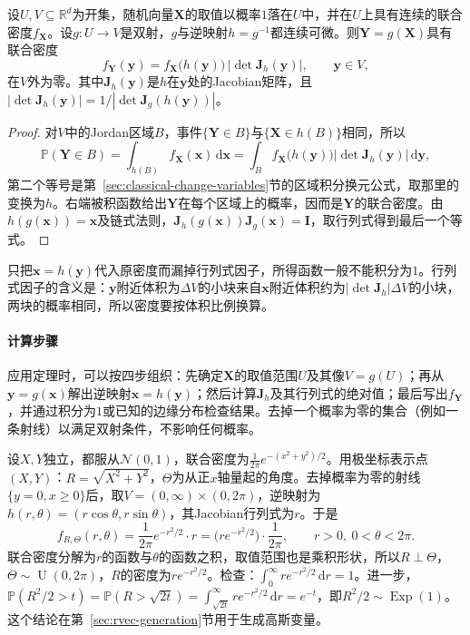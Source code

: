 \begin{theorem}[多元变量替换]
\label{thm:rvec-change-of-variables}
设$U,V\subseteq\mathbb R^d$为开集，随机向量$\bm X$的取值以概率$1$落在$U$中，并在$U$上具有连续的联合密度$f_{\bm X}$。设$g:U\to V$是双射，$g$与逆映射$h=g^{-1}$都连续可微。则$\bm Y=g(\bm X)$具有联合密度
\[
 f_{\bm Y}(\bm y)=f_{\bm X}\bigl(h(\bm y)\bigr)\,\bigl|\det\bm J_h(\bm y)\bigr|,\qquad\bm y\in V,
\]
在$V$外为零。其中$\bm J_h(\bm y)$是$h$在$\bm y$处的Jacobian矩阵，且$|\det\bm J_h(\bm y)|=1/|\det\bm J_g(h(\bm y))|$。
\end{theorem}

\begin{proof}
对$V$中的Jordan区域$B$，事件$\{\bm Y\in B\}$与$\{\bm X\in h(B)\}$相同，所以
\[
 \mathbb P(\bm Y\in B)=\int_{h(B)}f_{\bm X}(\bm x)\,\mathrm d\bm x=\int_Bf_{\bm X}\bigl(h(\bm y)\bigr)\bigl|\det\bm J_h(\bm y)\bigr|\,\mathrm d\bm y ,
\]
第二个等号是第~\ref{sec:classical-change-variables}节的区域积分换元公式，取那里的变换为$h$。右端被积函数给出$\bm Y$在每个区域上的概率，因而是$\bm Y$的联合密度。由$h(g(\bm x))=\bm x$及链式法则，$\bm J_h(g(\bm x))\bm J_g(\bm x)=\bm I$，取行列式得到最后一个等式。
\end{proof}

只把$\bm x=h(\bm y)$代入原密度而漏掉行列式因子，所得函数一般不能积分为$1$。行列式因子的含义是：$\bm y$附近体积为$\Delta V$的小块来自$\bm x$附近体积约为$|\det\bm J_h|\Delta V$的小块，两块的概率相同，所以密度要按体积比例换算。

\paragraph{计算步骤}
应用定理时，可以按四步组织：先确定$\bm X$的取值范围$U$及其像$V=g(U)$；再从$\bm y=g(\bm x)$解出逆映射$\bm x=h(\bm y)$；然后计算$\bm J_h$及其行列式的绝对值；最后写出$f_{\bm Y}$，并通过积分为$1$或已知的边缘分布检查结果。去掉一个概率为零的集合（例如一条射线）以满足双射条件，不影响任何概率。

\begin{example}[两个独立标准高斯变量的极坐标]
\label{ex:rvec-polar-gaussian}
设$X,Y$独立，都服从$\mathcal N(0,1)$，联合密度为$\frac1{2\pi}e^{-(x^2+y^2)/2}$。用极坐标表示点$(X,Y)$：$R=\sqrt{X^2+Y^2}$，$\Theta$为从正$x$轴量起的角度。去掉概率为零的射线$\{y=0,x\ge0\}$后，取$V=(0,\infty)\times(0,2\pi)$，逆映射为$h(r,\theta)=(r\cos\theta,r\sin\theta)$，其Jacobian行列式为$r$。于是
\[
 f_{R,\Theta}(r,\theta)=\frac1{2\pi}e^{-r^2/2}\cdot r=\bigl(re^{-r^2/2}\bigr)\cdot\frac1{2\pi},\qquad r>0,\ 0<\theta<2\pi .
\]
联合密度分解为$r$的函数与$\theta$的函数之积，取值范围也是乘积形状，所以$R\perp\Theta$，$\Theta\sim\operatorname{U}(0,2\pi)$，$R$的密度为$re^{-r^2/2}$。检查：$\int_0^\infty re^{-r^2/2}\,\mathrm dr=1$。进一步，$\mathbb P(R^2/2>t)=\mathbb P(R>\sqrt{2t})=\int_{\sqrt{2t}}^\infty re^{-r^2/2}\,\mathrm dr=e^{-t}$，即$R^2/2\sim\operatorname{Exp}(1)$。这个结论在第~\ref{sec:rvec-generation}节用于生成高斯变量。
\end{example}

